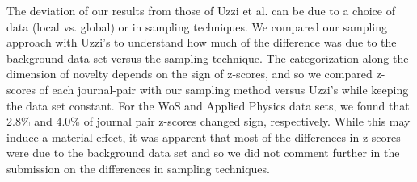 \documentclass[11pt, oneside]{article}   	%
\begin{document}
The deviation of our results from those of Uzzi et al. can be due to a choice of data (local vs. global) or in sampling techniques.  We compared our sampling approach with Uzzi's to understand how much of the difference was due to  the background data set versus the sampling technique. The categorization along the dimension of novelty depends on the sign of z-scores, and so we compared z-scores of each journal-pair with our sampling method versus Uzzi's while keeping  the data set constant.  For the WoS and Applied Physics data sets, we found that 2.8\% and 4.0\% of journal pair z-scores changed sign, respectively.  While this may induce a material effect, it was apparent that most of the differences in z-scores were due to the background data set and so we did not comment further in the submission on the differences in sampling techniques.
\end{document}
